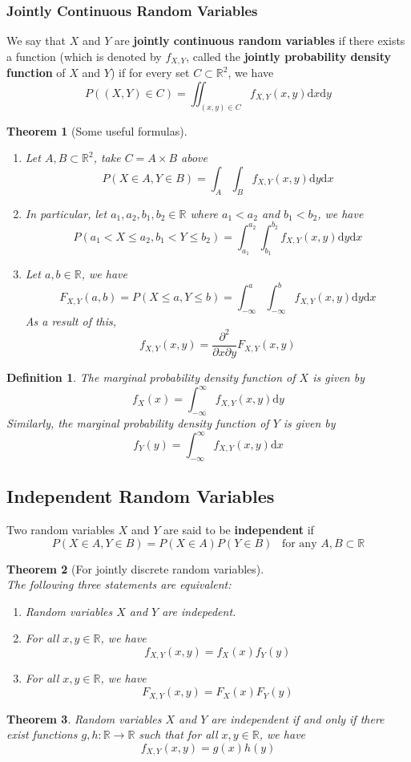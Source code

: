 \documentclass[12pt]{article}
\newcommand{\diff}{\mathrm{d}}
\newtheorem{definition}{Definition}[section]
\newtheorem{theorem}{Theorem}[section]
\theoremstyle{definition}
\begin{document}
\subsubsection{Jointly Continuous Random Variables}
We say that $X$ and $Y$ are \textbf{jointly continuous random variables} if there exists a function (which is denoted by $f_{X,Y}$, called the \textbf{jointly probability density function} of $X$ and $Y$) if for every set $C\subset \mathbb{R}^2$, we have
\[
P((X,Y)\in C)=\iint_{(x,y)\in C}f_{X,Y}(x,y)\diff x\diff y
\]
\begin{theorem}[Some useful formulas]
\begin{enumerate}
\item Let $A,B\subset\mathbb{R}^2$, take $C=A\times B$ above
\[
P(X\in A, Y\in B) = \int_A\int_Bf_{X,Y}(x,y)\diff y\diff x
\]
\item In particular, let $a_1,a_2,b_1,b_2\in\mathbb{R}$ where $a_1<a_2$ and $b_1<b_2$, we have
\[
P(a_1<X\leq a_2, b_1<Y\leq b_2) = \int_{a_1}^{a_2}\int_{b_1}^{b_2}f_{X,Y}(x,y)\diff y\diff x
\]
\item Let $a,b\in\mathbb{R}$, we have
\[
F_{X,Y}(a,b) = P(X\leq a, Y\leq b) = \int_{-\infty}^a\int_{-\infty}^{b}f_{X,Y}(x,y)\diff y \diff x
\]
As a result of this,
\[
f_{X,Y}(x,y) = \frac{\partial^2}{\partial x\partial y}F_{X,Y}(x,y)
\]
\end{enumerate}
\end{theorem}
\begin{definition}\normalfont The marginal probability density function of $X$ is given by
\[
f_X(x)=\int_{-\infty}^\infty f_{X,Y}(x,y)\diff y
\]
Similarly, the marginal probability density function of $Y$ is given by
\[
f_Y(y)=\int_{-\infty}^\infty f_{X,Y}(x,y)\diff x
\]
\end{definition}
\subsection{Independent Random Variables}
Two random variables $X$ and $Y$ are said to be \textbf{independent} if
\[
P(X\in A, Y\in B) = P(X\in A)P(Y\in B)\;\;\;\text{for any }A,B\subset \mathbb{R}
\]
\begin{theorem}[For jointly discrete random variables]
\hfill\\\normalfont The following three statements are equivalent:
\begin{enumerate}
\item Random variables $X$ and $Y$ are indepedent.
\item For all $x,y\in\mathbb{R}$, we have
\[
f_{X,Y}(x,y)=f_X(x)f_Y(y)
\]
\item For all $x,y\in\mathbb{R}$, we have
\[
F_{X,Y}(x,y)=F_X(x)F_Y(y)
\]
\end{enumerate}
\end{theorem}
\begin{theorem}\normalfont Random variables $X$ and $Y$ are independent if and only if there exist functions $g,h:\mathbb{R}\to\mathbb{R}$ such that for all $x,y\in\mathbb{R}$, we have
\[
f_{X,Y}(x,y) = g(x)h(y)
\] 
\end{theorem}
\end{document}

